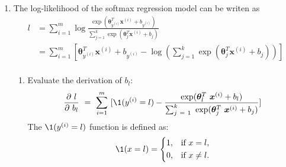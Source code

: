 \documentclass[a4paper]{article}
\begin{document}
\begin{enumerate}
  \setlength{\itemsep}{3\parskip}
\item The log-likelihood of the softmax regression model can be writen as  
\begin{equation*}
    \begin{aligned}
      l 
      &= \sum_{i = 1}^m \log \frac{\exp (\boldsymbol{\theta}^T_{y^{(i)}} \boldsymbol{x}^{(i)}+b_{y^{(i)} })}{\sum_{j = 1}^k \exp(\boldsymbol{\theta}^T_j \boldsymbol{x}^{(i)}+b_j)}\\
      &= \sum_{i = 1}^m [\boldsymbol{\theta}^T_{y^{(i)}} \boldsymbol{x}^{(i)}+b_{y^{(i)}} - \log (\sum_{j = 1}^k \exp(\boldsymbol{\theta}^T_j \boldsymbol{x}^{(i)}+b_j))]\\
    \end{aligned}
    \label{eq:svm:p}
  \end{equation*}

  \begin{enumerate}
  \item Evaluate the derivation of $b_l$:
    \begin{equation*}
      \frac{\partial l}{\partial b_l} = \sum_{i = 1}^m [\1 (y^{(i)}=l) - \frac{\exp(\boldsymbol{\theta}^T_l \boldsymbol{x}^{(i)}+b_l)}{\sum_{j = 1}^k \exp(\boldsymbol{\theta}^T_j \boldsymbol{x}^{(i)}+b_j)}]
    \end{equation*}
    \noindent The $\1 (y^{(i)}=l)$ function is defined as:
    \begin{equation*}
      \1(x=l)=
      \left\{
      \begin{aligned}
        1, &\quad\text{if}~ x = l,\\
        0, &\quad\text{if}~ x \neq l.
      \end{aligned}
      \right.
    \end{equation*}
   

\end{enumerate}
\end{enumerate}
\end{document}
